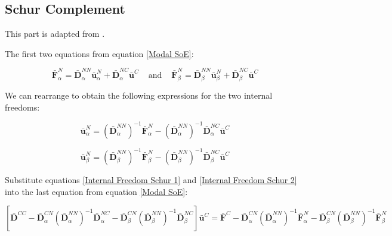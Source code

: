 \documentclass[../DomainDecomposition.tex]{subfiles}
\begin{document}
\subsection{Schur Complement} 

This part is adapted from \cite{chatterjee2021multilevel}. 
\vspace{10pt} 

The first two equations from equation \eqref{Modal SoE}: 

\begin{equation*}
    \bar{\mathbf{F}}_{\alpha}^{N} 
    =
    \bar{\mathbf{D}}_{\alpha}^{NN} \bar{\mathbf{u}}_{\alpha}^{N} 
    +
    \bar{\mathbf{D}}_{\alpha}^{NC} \bar{\mathbf{u}}^{C} 
    \phantom{xx} 
    \text{and} 
    \phantom{xx} 
    \bar{\mathbf{F}}_{\beta}^{N} 
    =
    \bar{\mathbf{D}}_{\beta}^{NN} \bar{\mathbf{u}}_{\beta}^{N} 
    +
    \bar{\mathbf{D}}_{\beta}^{NC} \bar{\mathbf{u}}^{C} 
\end{equation*}

We can rearrange to obtain the following expressions for the two internal freedoms: 

\begin{equation}
    \bar{\mathbf{u}}_{\alpha}^{N} 
    =
    \left(
        \bar{\mathbf{D}}_{\alpha}^{NN}
    \right)^{-1} 
    \bar{\mathbf{F}}_{\alpha}^{N} 
    -
    \left(
        \bar{\mathbf{D}}_{\alpha}^{NN}
    \right)^{-1} 
    \bar{\mathbf{D}}_{\alpha}^{NC} \bar{\mathbf{u}}^{C} 
\label{Internal Freedom Schur 1} 
\end{equation}


\begin{equation}
    \bar{\mathbf{u}}_{\beta}^{N} 
    =
    \left(
        \bar{\mathbf{D}}_{\beta}^{NN}
    \right)^{-1} 
    \bar{\mathbf{F}}_{\beta}^{N} 
    -
    \left(
        \bar{\mathbf{D}}_{\beta}^{NN}
    \right)^{-1} 
    \bar{\mathbf{D}}_{\beta}^{NC} \bar{\mathbf{u}}^{C} 
\label{Internal Freedom Schur 2} 
\end{equation}

Substitute equations \eqref{Internal Freedom Schur 1} and \eqref{Internal Freedom Schur 2} into the last equation from equation \eqref{Modal SoE}: 

\begin{equation}
    \left[
        \bar{\mathbf{D}}^{CC} - 
        \bar{\mathbf{D}}_{\alpha}^{CN} 
        \left(
            \bar{\mathbf{D}}_{\alpha}^{NN} 
        \right)^{-1} 
        \bar{\mathbf{D}}_{\alpha}^{NC} -
        \bar{\mathbf{D}}_{\beta}^{CN} 
        \left(
            \bar{\mathbf{D}}_{\beta}^{NN} 
        \right)^{-1} 
        \bar{\mathbf{D}}_{\beta}^{NC} 
    \right]
    \bar{\mathbf{u}}^{C} 
    =
    \bar{\mathbf{F}}^{C} - 
    \bar{\mathbf{D}}_{\alpha}^{CN} 
    \left(
        \bar{\mathbf{D}}_{\alpha}^{NN} 
    \right)^{-1} 
    \bar{\mathbf{F}}_{\alpha}^{N} - 
    \bar{\mathbf{D}}_{\beta}^{CN} 
    \left(
        \bar{\mathbf{D}}_{\beta}^{NN} 
    \right)^{-1} 
    \bar{\mathbf{F}}_{\beta}^{N}
\label{Boundary Freedom Schur} 
\end{equation}
\end{document}

